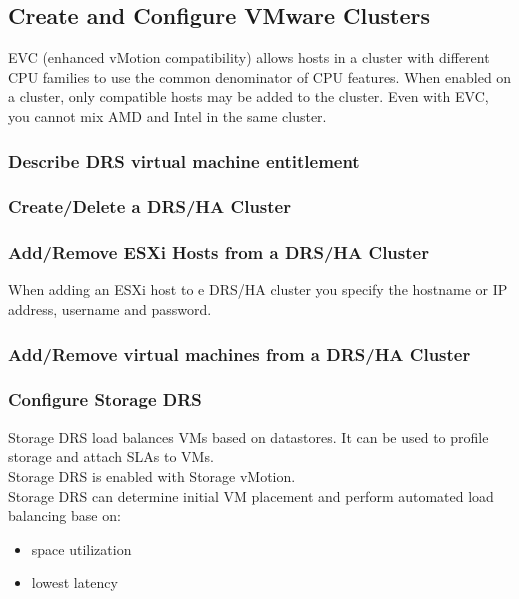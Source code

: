 \subsection{Create and Configure VMware Clusters}

EVC (enhanced vMotion compatibility) allows hosts in a cluster with different
CPU families to use the common denominator of CPU features. When enabled on a
cluster, only compatible hosts may be added to the cluster. Even with EVC,
you cannot mix AMD and Intel in the same cluster.

\subsubsection{Describe DRS virtual machine entitlement}

\subsubsection{Create/Delete a DRS/HA Cluster}

\subsubsection{Add/Remove ESXi Hosts from a DRS/HA Cluster}

When adding an ESXi host to e DRS/HA cluster you specify the hostname or
IP address, username and password.

\subsubsection{Add/Remove virtual machines from a DRS/HA Cluster}

\subsubsection{Configure Storage DRS}

Storage DRS load balances VMs based on datastores. It can be used to profile
storage and attach SLAs to VMs.\\

Storage DRS is enabled with Storage vMotion.\\

Storage DRS can determine initial VM placement and perform automated load
balancing base on:

\begin{itemize}

\item space utilization
\item lowest latency

\end{itemize}

